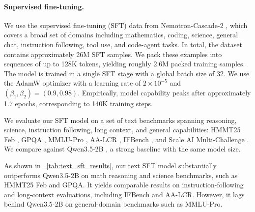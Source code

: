\paragraph{Supervised fine-tuning.}
We use the supervised fine-tuning (SFT) data from Nemotron-Cascade-2 \citep{yang2026nemotroncascade2}, which covers a broad set of domains including mathematics, coding, science, general chat, instruction following, tool use, and code-agent tasks. In total, the dataset contains approximately 26M SFT samples. We pack these examples into sequences of up to 128K tokens, yielding roughly 2.6M packed training samples. The model is trained in a single SFT stage with a global batch size of 32. We use the AdamW optimizer with a learning rate of $2\times10^{-5}$ and $(\beta_1,\beta_2)=(0.9,0.98)$. Empirically, model capability peaks after approximately 1.7 epochs, corresponding to 140K training steps.

We evaluate our SFT model on a set of text benchmarks spanning reasoning, science, instruction following, long context, and general capabilities: HMMT25 Feb \citep{hmmt2025feb}, GPQA \citep{rein2023gpqa}, MMLU-Pro \citep{wang2024mmlupro}, AA-LCR \citep{artificialanalysis2025lcr}, IFBench \citep{pyatkin2025generalizing}, and Scale AI Multi-Challenge \citep{sirdeshmukh2025multichallenge}. We compare against Qwen3.5-2B \citep{qwen3_5towards}, a strong baseline with the same model size.

As shown in ~\cref{tab:text_sft_results}, our text SFT model substantially outperforms Qwen3.5-2B on math reasoning and science benchmarks, such as HMMT25 Feb and GPQA. It yields comparable results on instruction-following and long-context evaluations, including IFBench and AA-LCR. However, it lags behind Qwen3.5-2B on general-domain benchmarks such as MMLU-Pro.


